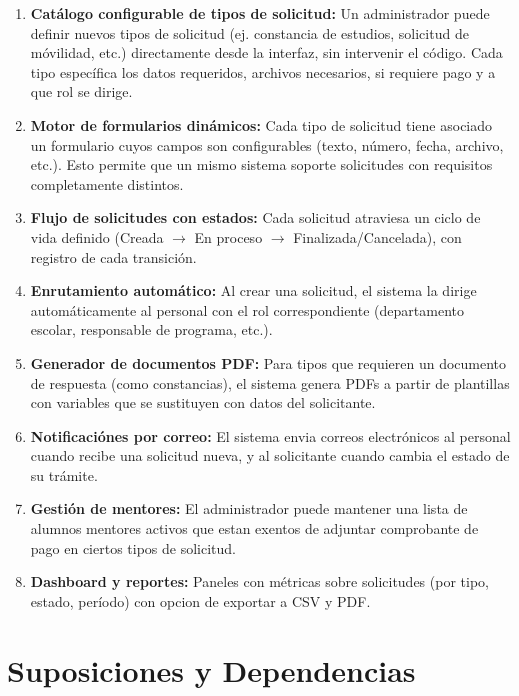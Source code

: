 \begin{enumerate}
    \item \textbf{Catálogo configurable de tipos de solicitud:} Un administrador puede definir nuevos tipos de solicitud (ej. constancia de estudios, solicitud de móvilidad, etc.) directamente desde la interfaz, sin intervenir el código. Cada tipo específica los datos requeridos, archivos necesarios, si requiere pago y a que rol se dirige.

    \item \textbf{Motor de formularios dinámicos:} Cada tipo de solicitud tiene asociado un formulario cuyos campos son configurables (texto, número, fecha, archivo, etc.). Esto permite que un mismo sistema soporte solicitudes con requisitos completamente distintos.

    \item \textbf{Flujo de solicitudes con estados:} Cada solicitud atraviesa un ciclo de vida definido (Creada $\rightarrow$ En proceso $\rightarrow$ Finalizada/Cancelada), con registro de cada transición.

    \item \textbf{Enrutamiento automático:} Al crear una solicitud, el sistema la dirige automáticamente al personal con el rol correspondiente (departamento escolar, responsable de programa, etc.).

    \item \textbf{Generador de documentos PDF:} Para tipos que requieren un documento de respuesta (como constancias), el sistema genera PDFs a partir de plantillas con variables que se sustituyen con datos del solicitante.

    \item \textbf{Notificaciónes por correo:} El sistema envia correos electrónicos al personal cuando recibe una solicitud nueva, y al solicitante cuando cambia el estado de su trámite.

    \item \textbf{Gestión de mentores:} El administrador puede mantener una lista de alumnos mentores activos que estan exentos de adjuntar comprobante de pago en ciertos tipos de solicitud.

    \item \textbf{Dashboard y reportes:} Paneles con métricas sobre solicitudes (por tipo, estado, período) con opcion de exportar a CSV y PDF.
\end{enumerate}

\section{Suposiciones y Dependencias}

